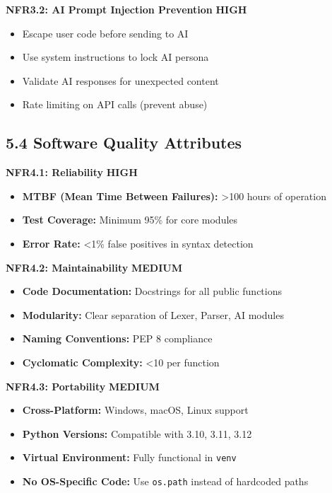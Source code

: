 \documentclass[a4paper,11pt]{article}
\newcommand{\priority}[1]{\colorbox{red!20}{\textbf{#1}}}
\newcommand{\prioritymed}[1]{\colorbox{yellow!20}{\textbf{#1}}}
\begin{document}
\textbf{NFR3.2: AI Prompt Injection Prevention} \priority{HIGH}

\begin{itemize}
    \item Escape user code before sending to AI
    \item Use system instructions to lock AI persona
    \item Validate AI responses for unexpected content
    \item Rate limiting on API calls (prevent abuse)
\end{itemize}

\subsection{5.4 Software Quality Attributes}

\textbf{NFR4.1: Reliability} \priority{HIGH}

\begin{itemize}
    \item \textbf{MTBF (Mean Time Between Failures):} >100 hours of operation
    \item \textbf{Test Coverage:} Minimum 95\% for core modules
    \item \textbf{Error Rate:} <1\% false positives in syntax detection
\end{itemize}

\textbf{NFR4.2: Maintainability} \prioritymed{MEDIUM}

\begin{itemize}
    \item \textbf{Code Documentation:} Docstrings for all public functions
    \item \textbf{Modularity:} Clear separation of Lexer, Parser, AI modules
    \item \textbf{Naming Conventions:} PEP 8 compliance
    \item \textbf{Cyclomatic Complexity:} <10 per function
\end{itemize}

\textbf{NFR4.3: Portability} \prioritymed{MEDIUM}

\begin{itemize}
    \item \textbf{Cross-Platform:} Windows, macOS, Linux support
    \item \textbf{Python Versions:} Compatible with 3.10, 3.11, 3.12
    \item \textbf{Virtual Environment:} Fully functional in \texttt{venv}
    \item \textbf{No OS-Specific Code:} Use \texttt{os.path} instead of hardcoded paths
\end{itemize}
\end{document}
